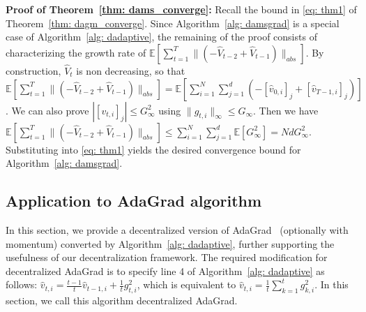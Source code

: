 \documentclass[11pt]{article}
\begin{document}
\noindent\textbf{Proof of Theorem~\ref{thm: dams_converge}:} 
Recall the bound in \eqref{eq: thm1} of Theorem~\ref{thm: dagm_converge}.
Since Algorithm~\ref{alg: damsgrad} is a special case of Algorithm~\ref{alg: dadaptive}, the remaining of the proof consists of characterizing the growth rate of $\mathbb E [ \sum_{t=1}^{T}   \|    (- \hat V_{t-2} + \hat V_{t-1} ) \|_{abs} ]$.
By construction, $\hat V_t$ is non decreasing, so that
$
\mathbb E [ \sum_{t=1}^{T}   \|    (- \hat V_{t-2} + \hat V_{t-1} ) \|_{abs} ] = \mathbb E [   \sum_{i=1}^N \sum_{j=1}^d    (- [\hat v_{0,i}]_j + [\hat v_{T-1,i}]_j ) ]
$.
We can also prove $|[v_{t,i}]_j| \leq G^2_{\infty}$ using $\|g_{t,i}\|_{\infty} \leq G_{\infty}$.
Then we have $\mathbb E \left[ \sum_{t=1}^{T}   \|    (- \hat V_{t-2} + \hat V_{t-1} ) \|_{abs} \right] \leq  \sum_{i=1}^N \sum_{j=1}^d  \mathbb E[G_{\infty}^2]=  Nd G_{\infty}^2$.
Substituting into \eqref{eq: thm1} yields the desired convergence bound for Algorithm~\ref{alg: damsgrad}.


\subsection{Application to AdaGrad algorithm}\label{sec:adagrad}

In this section, we provide a decentralized version of AdaGrad~\citep{duchi2011adaptive} (optionally with momentum) converted by Algorithm~\ref{alg: dadaptive}, further supporting the usefulness of our decentralization framework. 
The required modification for decentralized AdaGrad is to specify line 4 of Algorithm~\ref{alg: dadaptive} as follows: $ \hat v_{t,i} = \frac{t-1}{t} \hat v_{t-1,i} + \frac{1}{t} g_{t,i}^2 $, which is equivalent to  $\hat v_{t,i} = {\frac{1}{t}\sum_{k=1}^t g_{k,i}^2}$. 
In this section, we call this algorithm decentralized AdaGrad.
\end{document}
